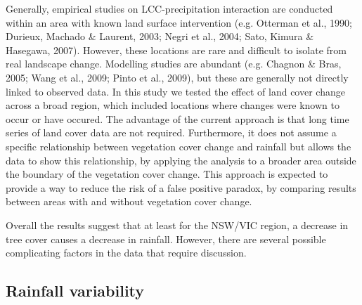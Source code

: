\documentclass[fleqn,10pt,lineno]{wlpeerj} %
\theoremstyle{definition}
\theoremstyle{definition}
\theoremstyle{definition}
\theoremstyle{remark}
\begin{document}
Generally, empirical studies on LCC-precipitation interaction are
conducted within an area with known land surface intervention (e.g.
Otterman et al., 1990; Durieux, Machado \& Laurent, 2003; Negri et al.,
2004; Sato, Kimura \& Hasegawa, 2007). However, these locations are rare
and difficult to isolate from real landscape change. Modelling studies
are abundant (e.g. Chagnon \& Bras, 2005; Wang et al., 2009; Pinto et
al., 2009), but these are generally not directly linked to observed
data. In this study we tested the effect of land cover change across a
broad region, which included locations where changes were known to occur
or have occured. The advantage of the current approach is that long time
series of land cover data are not required. Furthermore, it does not
assume a specific relationship between vegetation cover change and
rainfall but allows the data to show this relationship, by applying the
analysis to a broader area outside the boundary of the vegetation cover
change. This approach is expected to provide a way to reduce the risk of
a false positive paradox, by comparing results between areas with and
without vegetation cover change.

Overall the results suggest that at least for the NSW/VIC region, a
decrease in tree cover causes a decrease in rainfall. However, there are
several possible complicating factors in the data that require
discussion.

\subsection{Rainfall variability}\label{rainfall-variability}
\end{document}
